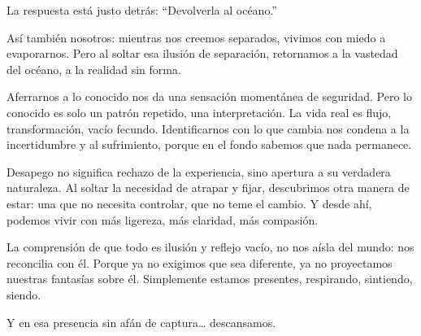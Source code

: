 \documentclass[
  a5paperpaper,
]{article}
\begin{document}
La respuesta está justo detrás: ``Devolverla al océano.''

Así también nosotros: mientras nos creemos separados, vivimos con miedo
a evaporarnos. Pero al soltar esa ilusión de separación, retornamos a la
vastedad del océano, a la realidad sin forma.

Aferrarnos a lo conocido nos da una sensación momentánea de seguridad.
Pero lo conocido es solo un patrón repetido, una interpretación. La vida
real es flujo, transformación, vacío fecundo. Identificarnos con lo que
cambia nos condena a la incertidumbre y al sufrimiento, porque en el
fondo sabemos que nada permanece.

Desapego no significa rechazo de la experiencia, sino apertura a su
verdadera naturaleza. Al soltar la necesidad de atrapar y fijar,
descubrimos otra manera de estar: una que no necesita controlar, que no
teme el cambio. Y desde ahí, podemos vivir con más ligereza, más
claridad, más compasión.

La comprensión de que todo es ilusión y reflejo vacío, no nos aísla del
mundo: nos reconcilia con él. Porque ya no exigimos que sea diferente,
ya no proyectamos nuestras fantasías sobre él. Simplemente estamos
presentes, respirando, sintiendo, siendo.

Y en esa presencia sin afán de captura\ldots{} descansamos.

\hfill\break

\hfill\break
\end{document}
